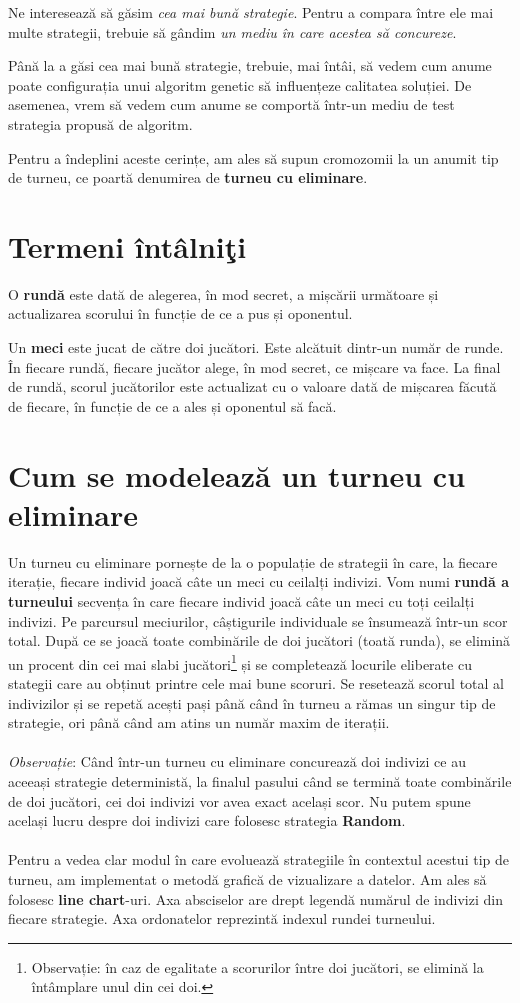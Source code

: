 Ne interesează să găsim \textit{cea mai bună strategie}. Pentru a compara între ele mai multe strategii, trebuie să gândim \textit{un mediu în care acestea să concureze}. 
 
Până la a găsi cea mai bună strategie, trebuie, mai întâi, să vedem cum anume poate configurația unui algoritm genetic să influențeze calitatea soluției. De asemenea, vrem să vedem cum anume se comportă într-un mediu de test strategia propusă de algoritm. 
 
Pentru a îndeplini aceste cerințe, am ales să supun cromozomii la un anumit tip de turneu, ce poartă denumirea de \textbf{turneu cu eliminare}.  

\section {Termeni întâlniţi}
O \textbf{rundă} este dată de alegerea, în mod secret, a mișcării următoare și actualizarea scorului în funcție de ce a pus și oponentul. 

Un \textbf{meci} este jucat de către doi jucători. Este alcătuit dintr-un număr de runde. În fiecare rundă, fiecare jucător alege, în mod secret, ce mișcare va face. La final de rundă, scorul jucătorilor este actualizat cu o valoare dată de mișcarea făcută de fiecare, în funcție de ce a ales și oponentul să facă. 

\section {Cum se modelează un turneu cu eliminare}
 
Un turneu cu eliminare pornește de la o populație de strategii în care, la fiecare iterație, fiecare individ joacă câte un meci cu ceilalți indivizi. Vom numi \textbf{rundă a turneului} secvența în care fiecare individ joacă câte un meci cu toți ceilalți indivizi. Pe parcursul meciurilor, câștigurile individuale se însumează într-un scor total. După ce se joacă toate combinările de doi jucători (toată runda), se elimină un procent din cei mai slabi jucători\footnote{Observație: în caz de egalitate a scorurilor între doi jucători, se elimină la întâmplare unul din cei doi.} și se completează locurile eliberate cu stategii care au obținut printre cele mai bune scoruri. Se resetează scorul total al indivizilor și se repetă acești pași până când în turneu a rămas un singur tip de strategie, ori până când am atins un număr maxim de iterații. 
\\\\
\textit{Observație}: Când într-un turneu cu eliminare concurează doi indivizi ce au aceeași strategie deterministă, la finalul pasului când se termină toate combinările de doi jucători, cei doi indivizi vor avea exact același scor. Nu putem spune același lucru despre doi indivizi care folosesc strategia \textbf{Random}.
\\\\
Pentru a vedea clar modul în care evoluează strategiile în contextul acestui tip de turneu, am implementat o metodă grafică de vizualizare a datelor. Am ales să folosesc \textbf{line chart}-uri. Axa absciselor are drept legendă numărul de indivizi din fiecare strategie. Axa ordonatelor reprezintă indexul rundei turneului. 

